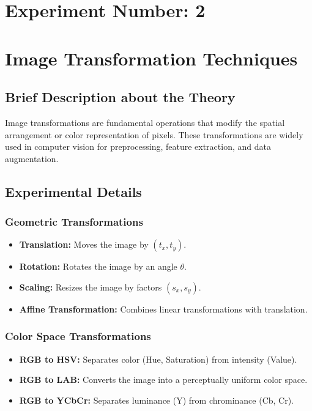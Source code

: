 \documentclass[12pt,a4paper]{article}
\begin{document}
\newpage
\section*{Experiment Number: 2}
\section{Image Transformation Techniques}

\subsection{Brief Description about the Theory}
Image transformations are fundamental operations that modify the spatial arrangement or color representation of pixels. These transformations are widely used in computer vision for preprocessing, feature extraction, and data augmentation.

\subsection{Experimental Details}
\subsubsection{Geometric Transformations}
\begin{itemize}
  \item \textbf{Translation:} Moves the image by \((t_x, t_y)\).
  \item \textbf{Rotation:} Rotates the image by an angle \(\theta\).
  \item \textbf{Scaling:} Resizes the image by factors \((s_x, s_y)\).
  \item \textbf{Affine Transformation:} Combines linear transformations with translation.
\end{itemize}

\subsubsection{Color Space Transformations}
\begin{itemize}
  \item \textbf{RGB to HSV:} Separates color (Hue, Saturation) from intensity (Value).
  \item \textbf{RGB to LAB:} Converts the image into a perceptually uniform color space.
  \item \textbf{RGB to YCbCr:} Separates luminance (Y) from chrominance (Cb, Cr).
\end{itemize}
\end{document}
